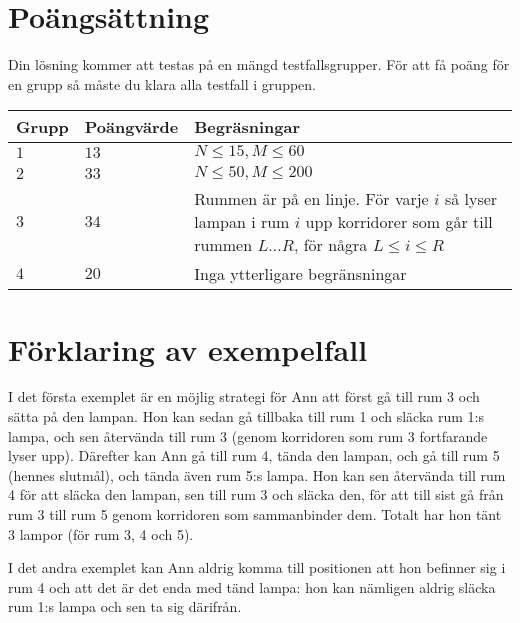 \section*{Poängsättning}
Din lösning kommer att testas på en mängd testfallsgrupper.
För att få poäng för en grupp så måste du klara alla testfall i gruppen.

\noindent
\begin{tabular}{| l | l | p{7cm} |}
\hline
Grupp & Poängvärde & Begräsningar \\ \hline
$1$   & $13$       & $N \le 15, M \le 60$ \\ \hline
$2$   & $33$       & $N \le 50, M \le 200$ \\ \hline
$3$   & $34$       & Rummen är på en linje. För varje $i$ så lyser lampan i rum $i$ upp korridorer som går till rummen $L \dots R$, för några $L \le i \le R$ \\ \hline
$4$   & $20$       & Inga ytterligare begränsningar \\ \hline
\end{tabular}

\section*{Förklaring av exempelfall}
I det första exemplet är en möjlig strategi för Ann att först gå till rum 3 och sätta på den lampan.
Hon kan sedan gå tillbaka till rum 1 och släcka rum 1:s lampa, och sen återvända till rum 3 (genom korridoren som rum 3 fortfarande lyser upp).
Därefter kan Ann gå till rum 4, tända den lampan, och gå till rum 5 (hennes slutmål), och tända även rum 5:s lampa.
Hon kan sen återvända till rum 4 för att släcka den lampan, sen till rum 3 och släcka den, för att till sist gå från rum 3 till rum 5 genom korridoren som sammanbinder dem.
Totalt har hon tänt 3 lampor (för rum 3, 4 och 5).

I det andra exemplet kan Ann aldrig komma till positionen att hon befinner sig i rum 4 och att det är det enda med tänd lampa: hon kan nämligen aldrig släcka rum 1:s lampa och sen ta sig därifrån.
